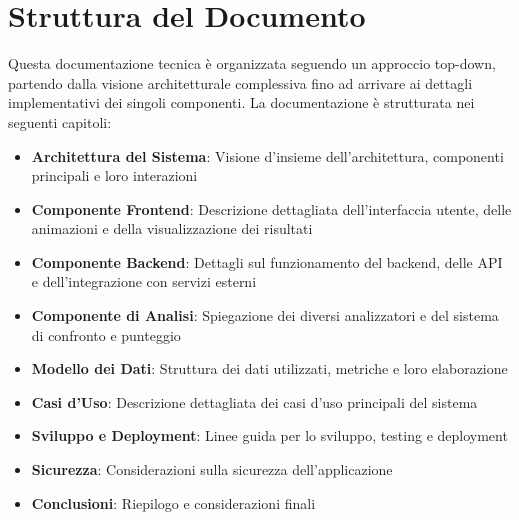 \section{Struttura del Documento}
Questa documentazione tecnica è organizzata seguendo un approccio top-down, partendo dalla visione architetturale complessiva fino ad arrivare ai dettagli implementativi dei singoli componenti. La documentazione è strutturata nei seguenti capitoli:

\begin{itemize}
    \item \textbf{Architettura del Sistema}: Visione d'insieme dell'architettura, componenti principali e loro interazioni
    \item \textbf{Componente Frontend}: Descrizione dettagliata dell'interfaccia utente, delle animazioni e della visualizzazione dei risultati
    \item \textbf{Componente Backend}: Dettagli sul funzionamento del backend, delle API e dell'integrazione con servizi esterni
    \item \textbf{Componente di Analisi}: Spiegazione dei diversi analizzatori e del sistema di confronto e punteggio
    \item \textbf{Modello dei Dati}: Struttura dei dati utilizzati, metriche e loro elaborazione
    \item \textbf{Casi d'Uso}: Descrizione dettagliata dei casi d'uso principali del sistema
    \item \textbf{Sviluppo e Deployment}: Linee guida per lo sviluppo, testing e deployment
    \item \textbf{Sicurezza}: Considerazioni sulla sicurezza dell'applicazione
    \item \textbf{Conclusioni}: Riepilogo e considerazioni finali
\end{itemize}